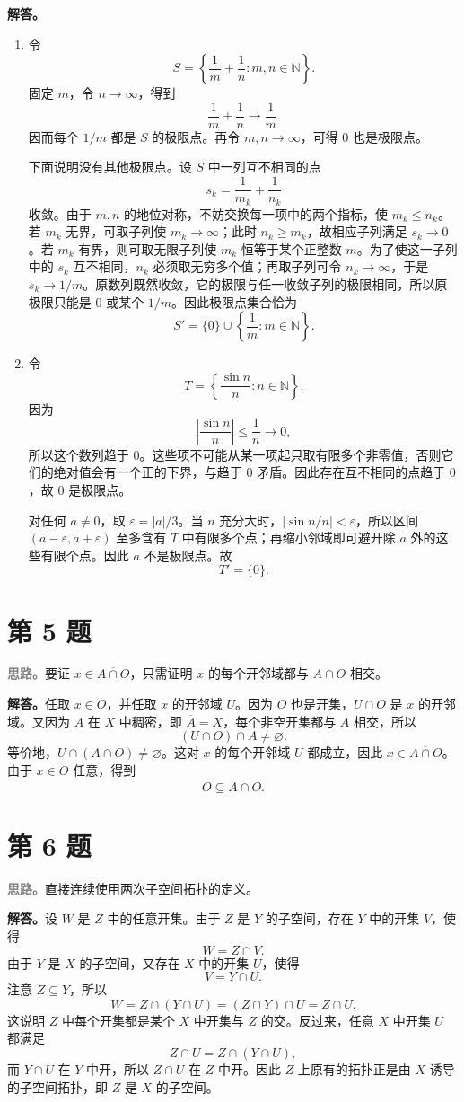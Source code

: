 \documentclass[UTF8,a4paper,11pt,fontset=windows]{ctexart}
\newcommand{\problem}[1]{\section*{第 #1 题}}
\newcommand{\idea}{\par\noindent\textcolor{gray}{\textbf{思路。}}}
\newcommand{\solution}{\par\noindent\textbf{解答。}}
\begin{document}
\solution
\begin{enumerate}
  \item 令
  \[
    S=\left\{\frac1m+\frac1n:m,n\in\mathbb N\right\}.
  \]
  固定 $m$，令 $n\to\infty$，得到
  \[
    \frac1m+\frac1n\longrightarrow\frac1m.
  \]
  因而每个 $1/m$ 都是 $S$ 的极限点。再令 $m,n\to\infty$，可得 $0$ 也是极限点。

  下面说明没有其他极限点。设 $S$ 中一列互不相同的点
  \[
    s_k=\frac1{m_k}+\frac1{n_k}
  \]
  收敛。由于 $m,n$ 的地位对称，不妨交换每一项中的两个指标，使 $m_k\leq n_k$。若 $m_k$ 无界，可取子列使 $m_k\to\infty$；此时 $n_k\geq m_k$，故相应子列满足 $s_k\to0$。若 $m_k$ 有界，则可取无限子列使 $m_k$ 恒等于某个正整数 $m$。为了使这一子列中的 $s_k$ 互不相同，$n_k$ 必须取无穷多个值；再取子列可令 $n_k\to\infty$，于是 $s_k\to1/m$。原数列既然收敛，它的极限与任一收敛子列的极限相同，所以原极限只能是 $0$ 或某个 $1/m$。因此极限点集合恰为
  \[
    S'=\{0\}\cup\left\{\frac1m:m\in\mathbb N\right\}.
  \]

  \item 令
  \[
    T=\left\{\frac{\sin n}{n}:n\in\mathbb N\right\}.
  \]
  因为
  \[
    \left|\frac{\sin n}{n}\right|\leq\frac1n\longrightarrow0,
  \]
  所以这个数列趋于 $0$。这些项不可能从某一项起只取有限多个非零值，否则它们的绝对值会有一个正的下界，与趋于 $0$ 矛盾。因此存在互不相同的点趋于 $0$，故 $0$ 是极限点。

  对任何 $a\neq0$，取 $\varepsilon=|a|/3$。当 $n$ 充分大时，$|\sin n/n|<\varepsilon$，所以区间 $(a-\varepsilon,a+\varepsilon)$ 至多含有 $T$ 中有限多个点；再缩小邻域即可避开除 $a$ 外的这些有限个点。因此 $a$ 不是极限点。故
  \[
    T'=\{0\}.
  \]
\end{enumerate}

\problem{5}
\idea 要证 $x\in\overline{A\cap O}$，只需证明 $x$ 的每个开邻域都与 $A\cap O$ 相交。

\solution 任取 $x\in O$，并任取 $x$ 的开邻域 $U$。因为 $O$ 也是开集，$U\cap O$ 是 $x$ 的开邻域。又因为 $A$ 在 $X$ 中稠密，即 $\overline A=X$，每个非空开集都与 $A$ 相交，所以
\[
  (U\cap O)\cap A\neq\varnothing.
\]
等价地，$U\cap(A\cap O)\neq\varnothing$。这对 $x$ 的每个开邻域 $U$ 都成立，因此 $x\in\overline{A\cap O}$。由于 $x\in O$ 任意，得到
\[
  O\subseteq\overline{A\cap O}.
\]

\problem{6}
\idea 直接连续使用两次子空间拓扑的定义。

\solution 设 $W$ 是 $Z$ 中的任意开集。由于 $Z$ 是 $Y$ 的子空间，存在 $Y$ 中的开集 $V$，使得
\[
  W=Z\cap V.
\]
由于 $Y$ 是 $X$ 的子空间，又存在 $X$ 中的开集 $U$，使得
\[
  V=Y\cap U.
\]
注意 $Z\subseteq Y$，所以
\[
  W=Z\cap(Y\cap U)=(Z\cap Y)\cap U=Z\cap U.
\]
这说明 $Z$ 中每个开集都是某个 $X$ 中开集与 $Z$ 的交。反过来，任意 $X$ 中开集 $U$ 都满足
\[
  Z\cap U=Z\cap(Y\cap U),
\]
而 $Y\cap U$ 在 $Y$ 中开，所以 $Z\cap U$ 在 $Z$ 中开。因此 $Z$ 上原有的拓扑正是由 $X$ 诱导的子空间拓扑，即 $Z$ 是 $X$ 的子空间。
\end{document}
